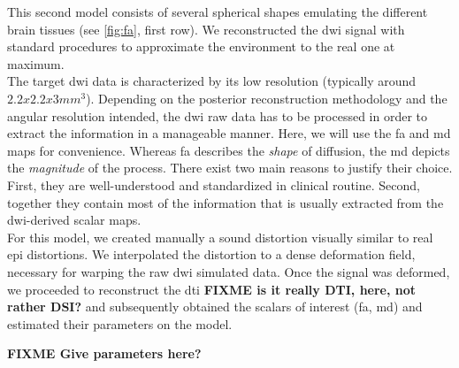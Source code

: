 This second model consists of several spherical shapes emulating
the different brain tissues (see \autoref{fig:fa}, first row). 
We reconstructed the \ac{dwi} signal with standard procedures to approximate the
environment to the real one at maximum. \\

The target \ac{dwi} data is characterized by its
low resolution (typically around $2.2x2.2x3mm^3$). Depending on the
posterior reconstruction methodology and the angular resolution
intended, the \ac{dwi} raw data has to be processed in order to
extract the information in a manageable manner. Here, we
will use the \ac{fa} and \ac{md} maps for convenience.
Whereas \ac{fa} describes the \emph{shape} of diffusion, 
the \ac{md} depicts the \emph{magnitude} of the process. 
There exist two main reasons to justify their choice. 
First, they are well-understood and standardized in clinical routine.
Second, together they contain most of the information that is
usually extracted from the \ac{dwi}-derived scalar maps. \\

For this model, we created manually a sound distortion visually similar
to real \ac{epi} distortions. We interpolated the distortion to a 
dense deformation field, necessary for warping the raw \ac{dwi} simulated
data. Once the signal was deformed, we proceeded to reconstruct the
\ac{dti} \textbf{FIXME is it really DTI, here, not rather DSI?} and subsequently obtained the scalars of interest (\ac{fa}, \ac{md}) and estimated their parameters on the model.

\textbf{FIXME Give parameters here?}\\
